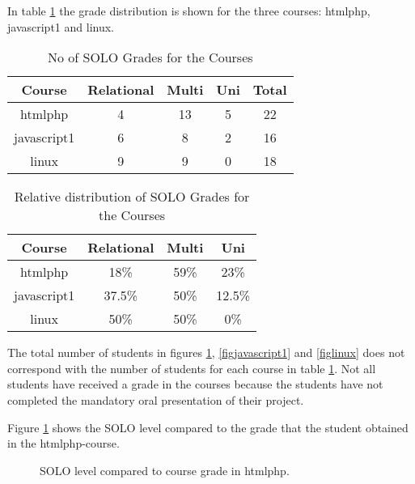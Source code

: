 \documentclass[twoside,twocolumn,a4paper,11pt,english]{article}
\begin{document}
In table \ref{table:solo} the grade distribution is shown for the three courses: htmlphp, javascript1 and linux.

\begin{table}[H]
\caption{No of SOLO Grades for the Courses}
\centering
\begin{tabular}{c | c c c | c}
Course & Relational & Multi & Uni & Total  \\ [0.5ex] %
\hline
htmlphp & 4 & 13 & 5 & 22 \\
javascript1 & 6 & 8 & 2 & 16\\
linux & 9 & 9 & 0 & 18 \\
\end{tabular}
\label{table:solo}
\end{table}

\begin{table}[H]
\caption{Relative distribution of SOLO Grades for the Courses}
\centering
\begin{tabular}{c | c c c}
Course & Relational & Multi & Uni \\ [0.5ex] %
\hline
htmlphp & 18\% & 59\% & 23\% \\
javascript1 & 37.5\% & 50\% & 12.5\%\\
linux & 50\% & 50\% & 0\%\\ [1ex]
\end{tabular}
\label{table:solorelative}
\end{table}

The total number of students in figures \ref{fightmlphp}, \ref{figjavascript1} and \ref{figlinux} does not correspond with the number of students for each course in table \ref{table:solo}. Not all students have received a grade in the courses because the students have not completed the mandatory oral presentation of their project.

Figure \ref{fightmlphp} shows the SOLO level compared to the grade that the student obtained in the htmlphp-course.

\begin{figure}[H]
\caption{SOLO level compared to course grade in htmlphp.}
\label{fightmlphp}
\end{figure}
\end{document}
